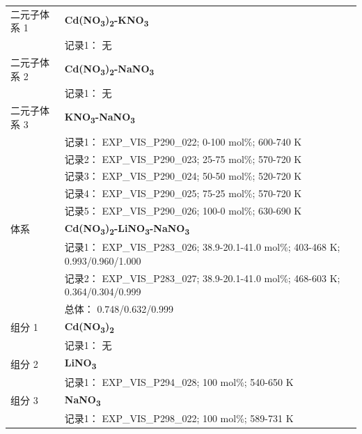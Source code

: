 \documentclass[12pt]{article}
\begin{document}
{\begin{longtable}[]{@{}
  >{\raggedright\arraybackslash}p{}
  >{\raggedright\arraybackslash}p{}@{}}
二元子体系 1 & \textbf{Cd(NO\textsubscript{3})\textsubscript{2}-KNO\textsubscript{3}} \\
 & 记录1： 无 \\
二元子体系 2 & \textbf{Cd(NO\textsubscript{3})\textsubscript{2}-NaNO\textsubscript{3}} \\
 & 记录1： 无 \\
二元子体系 3  & \textbf{KNO\textsubscript{3}-NaNO\textsubscript{3}} \\
 & 记录1： EXP\_VIS\_P290\_022; 0-100 mol\%; 600-740 K \\
 & 记录2： EXP\_VIS\_P290\_023; 25-75 mol\%; 570-720 K \\
 & 记录3： EXP\_VIS\_P290\_024; 50-50 mol\%; 520-720 K \\
 & 记录4： EXP\_VIS\_P290\_025; 75-25 mol\%; 570-720 K \\
 & 记录5： EXP\_VIS\_P290\_026; 100-0 mol\%; 630-690 K  \\

\midrule
体系 & \textbf{Cd(NO\textsubscript{3})\textsubscript{2}-LiNO\textsubscript{3}-NaNO\textsubscript{3}} \\
 & 记录1： EXP\_VIS\_P283\_026; 38.9-20.1-41.0 mol\%; 403-468 K; 0.993/0.960/1.000 \\
 & 记录2： EXP\_VIS\_P283\_027; 38.9-20.1-41.0 mol\%; 468-603 K; 0.364/0.304/0.999 \\
 & 总体： 0.748/0.632/0.999  \\

组分 1 & \textbf{Cd(NO\textsubscript{3})\textsubscript{2}} \\
 & 记录1： 无 \\
组分 2  & \textbf{LiNO\textsubscript{3}} \\
 & 记录1： EXP\_VIS\_P294\_028; 100 mol\%; 540-650 K  \\

组分 3  & \textbf{NaNO\textsubscript{3}} \\
 & 记录1： EXP\_VIS\_P298\_022; 100 mol\%; 589-731 K  \\


\end{longtable}}
\end{document}
